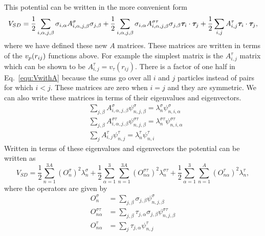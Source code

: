 This potential can be written in the more convenient form
\begin{equation}
   V_{SD} = \frac{1}{2}\sum\limits_{i,\alpha,j,\beta} \sigma_{i,\alpha}A^{\sigma}_{i,\alpha,j,\beta}\sigma_{j,\beta}
      + \frac{1}{2}\sum\limits_{i,\alpha,j,\beta} \sigma_{i,\alpha}A^{\sigma\tau}_{i,\alpha,j,\beta}\sigma_{j,\beta}\bm{\tau}_i\cdot\bm{\tau}_j
      + \frac{1}{2}\sum\limits_{i,j} A^{\tau}_{i,j}\bm{\tau}_i\cdot\bm{\tau}_j,
   \label{equ:VwithA}
\end{equation}
where we have defined these new $A$ matrices. These matrices are written in terms of the $v_p(r_{ij})$ functions above. For example the simplest matrix is the $A^{\tau}_{i,j}$ matrix which can be shown to be $A^{\tau}_{i,j} = v_{\tau}(r_{ij})$. There is a factor of one half in Eq.~\ref{equ:VwithA} because the sums go over all $i$ and $j$ particles instead of pairs for which $i<j$. These matrices are zero when $i=j$ and they are symmetric. We can also write these matrices in terms of their eigenvalues and eigenvectors.
\begin{align}
   &\sum\limits_{j,\beta} A^{\sigma}_{i,\alpha,j,\beta}\psi^{\sigma}_{n,j,\beta} = \lambda^{\sigma}_n\psi^{\sigma}_{n,i,\alpha} \\
   &\sum\limits_{j,\beta} A^{\sigma\tau}_{i,\alpha,j,\beta}\psi^{\sigma\tau}_{n,j,\beta} = \lambda^{\sigma\tau}_n\psi^{\sigma\tau}_{n,i,\alpha} \\
   &\sum\limits_{j} A^{\tau}_{i,j}\psi^{\tau}_{n,j} = \lambda^{\tau}_n\psi^{\tau}_{n,i}
\end{align}
Written in terms of these eigenvalues and eigenvectors the potential can be written as
\begin{equation}
   V_{SD} = \frac{1}{2}\sum\limits_{n=1}^{3A} \left(O_{n}^{\sigma}\right)^2 \lambda_n^{\sigma}
      + \frac{1}{2}\sum\limits_{\alpha=1}^{3}\sum\limits_{n=1}^{3A} \left(O_{n\alpha}^{\sigma\tau}\right)^2 \lambda_n^{\sigma\tau}
      + \frac{1}{2}\sum\limits_{\alpha=1}^{3}\sum\limits_{n=1}^{A} \left(O_{n\alpha}^{\tau}\right)^2 \lambda_n^{\tau},
\end{equation}
where the operators are given by
\begin{equation}
\begin{split}
   O_{n}^{\sigma} &= \sum\limits_{j,\beta} \sigma_{j,\beta}\psi_{n,j,\beta}^{\sigma} \\
   O_{n\alpha}^{\sigma\tau} &= \sum\limits_{j,\beta} \tau_{j,\alpha}\sigma_{j,\beta}\psi_{n,j,\beta}^{\sigma\tau} \\
   O_{n\alpha}^{\tau} &= \sum\limits_{j} \tau_{j,\alpha}\psi_{n,j}^{\tau}
\end{split}
\end{equation}
